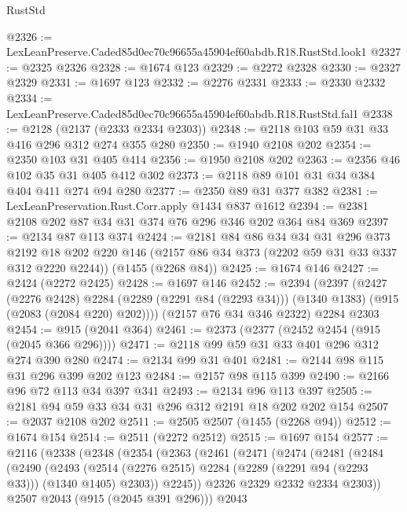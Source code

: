 \begin{lexlean}{RustStd}
\begin{coremodule}
@2326 := LexLeanPreserve.Caded85d0ec70c96655a45904ef60abdb.R18.RustStd.look1
@2327 := @2325 @2326
@2328 := @1674 @123
@2329 := @2272 @2328
@2330 := @2327 @2329
@2331 := @1697 @123
@2332 := @2276 @2331
@2333 := @2330 @2332
@2334 := LexLeanPreserve.Caded85d0ec70c96655a45904ef60abdb.R18.RustStd.fal1
@2338 := @2128 (@2137 (@2333 @2334 @2303))
@2348 := @2118 @103 @59 @31 @33 @416 @296 @312 @274 @355 @280
@2350 := @1940 @2108 @202
@2354 := @2350 @103 @31 @405 @414
@2356 := @1950 @2108 @202
@2363 := @2356 @46 @102 @35 @31 @405 @412 @302
@2373 := @2118 @89 @101 @31 @34 @384 @404 @411 @274 @94 @280
@2377 := @2350 @89 @31 @377 @382
@2381 := LexLeanPreservation.Rust.Corr.apply @1434 @837 @1612
@2394 := @2381 @2108 @202 @87 @34 @31 @374 @76 @296 @346 @202 @364 @84 @369
@2397 := @2134 @87 @113 @374
@2424 := @2181
    @84
    @86
    @34
    @34
    @31
    @296
    @373
    @2192
    @18
    @202
    @220
    @146
    (@2157 @86 @34 @373 (@2202 @59 @31 @33 @337 @312 @2220 @2244))
    (@1455 (@2268 @84))
@2425 := @1674 @146
@2427 := @2424 (@2272 @2425)
@2428 := @1697 @146
@2452 := @2394
    (@2397
      (@2427
        (@2276 @2428)
        @2284
        (@2289 (@2291 @84 (@2293 @34)))
        (@1340 @1383)
        (@915 (@2083 (@2084 @220) @202))))
    (@2157 @76 @34 @346 @2322)
    @2284
    @2303
@2454 := @915 (@2041 @364)
@2461 := @2373 (@2377 (@2452 @2454 (@915 (@2045 @366 @296))))
@2471 := @2118 @99 @59 @31 @33 @401 @296 @312 @274 @390 @280
@2474 := @2134 @99 @31 @401
@2481 := @2144 @98 @115 @31 @296 @399 @202 @123
@2484 := @2157 @98 @115 @399
@2490 := @2166 @96 @72 @113 @34 @397 @341
@2493 := @2134 @96 @113 @397
@2505 := @2181 @94 @59 @33 @34 @31 @296 @312 @2191 @18 @202 @202 @154
@2507 := @2037 @2108 @202
@2511 := @2505 @2507 (@1455 (@2268 @94))
@2512 := @1674 @154
@2514 := @2511 (@2272 @2512)
@2515 := @1697 @154
@2577 := @2116
    (@2338
      (@2348
        (@2354
          (@2363
            (@2461
              (@2471
                (@2474
                  (@2481
                    (@2484
                      (@2490
                        (@2493
                          (@2514
                            (@2276 @2515)
                            @2284
                            (@2289 (@2291 @94 (@2293 @33)))
                            (@1340 @1405)
                            @2303))
                        @2245))
                    @2326
                    @2329
                    @2332
                    @2334
                    @2303))
                @2507
                @2043
                (@915 (@2045 @391 @296)))
              @2043

\end{coremodule}
\end{lexlean}
